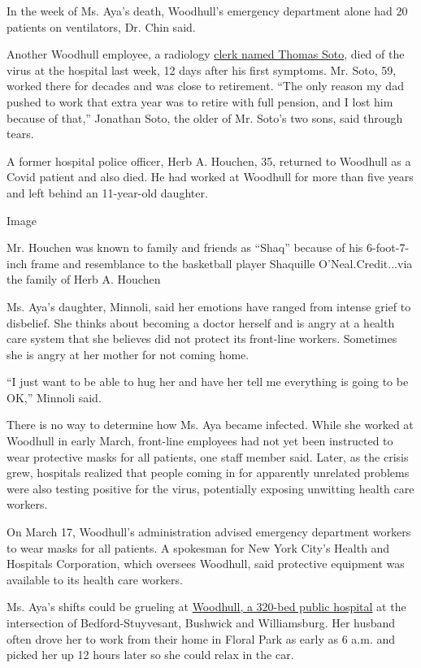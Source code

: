 In the week of Ms. Aya's death, Woodhull's emergency department alone
had 20 patients on ventilators, Dr. Chin said.

Another Woodhull employee, a radiology
\href{https://www.facebook.com/permalink.php?story_fbid=2944721018928457\&id=100001717633057}{clerk
named Thomas Soto}, died of the virus at the hospital last week, 12 days
after his first symptoms. Mr. Soto, 59, worked there for decades and was
close to retirement. ``The only reason my dad pushed to work that extra
year was to retire with full pension, and I lost him because of that,''
Jonathan Soto, the older of Mr. Soto's two sons, said through tears.

A former hospital police officer, Herb A. Houchen, 35, returned to
Woodhull as a Covid patient and also died. He had worked at Woodhull for
more than five years and left behind an 11-year-old daughter.

Image

Mr. Houchen was known to family and friends as ``Shaq'' because of his
6-foot-7-inch frame and resemblance to the basketball player Shaquille
O'Neal.Credit...via the family of Herb A. Houchen

Ms. Aya's daughter, Minnoli, said her emotions have ranged from intense
grief to disbelief. She thinks about becoming a doctor herself and is
angry at a health care system that she believes did not protect its
front-line workers. Sometimes she is angry at her mother for not coming
home.

``I just want to be able to hug her and have her tell me everything is
going to be OK,'' Minnoli said.

There is no way to determine how Ms. Aya became infected. While she
worked at Woodhull in early March, front-line employees had not yet been
instructed to wear protective masks for all patients, one staff member
said. Later, as the crisis grew, hospitals realized that people coming
in for apparently unrelated problems were also testing positive for the
virus, potentially exposing unwitting health care workers.

On March 17, Woodhull's administration advised emergency department
workers to wear masks for all patients. A spokesman for New York City's
Health and Hospitals Corporation, which oversees Woodhull, said
protective equipment was available to its health care workers.

Ms. Aya's shifts could be grueling at
\href{https://www.nychealthandhospitals.org/woodhull/}{Woodhull, a
320-bed public hospital} at the intersection of Bedford-Stuyvesant,
Bushwick and Williamsburg. Her husband often drove her to work from
their home in Floral Park as early as 6 a.m. and picked her up 12 hours
later so she could relax in the car.

